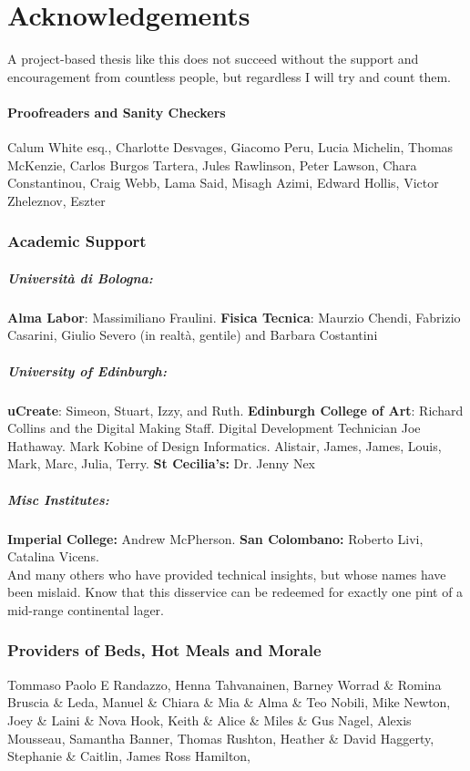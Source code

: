 \section*{\centering Acknowledgements}

A project-based thesis like this does not succeed without the support and encouragement from countless people, but regardless I will try and count them.

\paragraph{Proofreaders and Sanity Checkers}
Calum White esq., Charlotte Desvages, Giacomo Peru, Lucia Michelin, Thomas McKenzie, Carlos Burgos Tartera, Jules Rawlinson, Peter Lawson, Chara Constantinou, Craig Webb, Lama Said, Misagh Azimi, Edward Hollis, Victor Zheleznov, {\tiny Eszter}

\subsubsection{Academic Support}

\subparagraph{Università di Bologna:} \textbf{Alma Labor}: Massimiliano Fraulini. \textbf{Fisica Tecnica}: Maurzio Chendi, Fabrizio Casarini, Giulio Severo (in realtà, gentile) and Barbara Costantini    

\subparagraph{University of Edinburgh:} 
\textbf{uCreate}: Simeon, Stuart, Izzy, and Ruth. \textbf{Edinburgh College of Art}: Richard Collins and the Digital Making Staff. Digital Development Technician Joe Hathaway. Mark Kobine of Design Informatics. Alistair, James, James, Louis, Mark, Marc, Julia, Terry. \textbf{St Cecilia's:} Dr. Jenny Nex

\subparagraph{Misc Institutes:}\textbf{Imperial College:} Andrew McPherson. \textbf{San Colombano:} Roberto Livi, Catalina Vicens.\\

And many others who have provided technical insights, but whose names have been mislaid. Know that this disservice can be redeemed for exactly one pint of a mid-range continental lager.

\subsubsection{Providers of Beds, Hot Meals and Morale}

Tommaso Paolo E Randazzo, Henna Tahvanainen, Barney Worrad \& Romina Bruscia \& Leda, Manuel \& Chiara \& Mia \& Alma \& Teo Nobili, Mike Newton, Joey \& Laini \& Nova Hook, Keith \& Alice \& Miles \& Gus Nagel, Alexis Mousseau, Samantha Banner, Thomas Rushton, Heather \& David Haggerty, Stephanie \& Caitlin, James Ross Hamilton,


